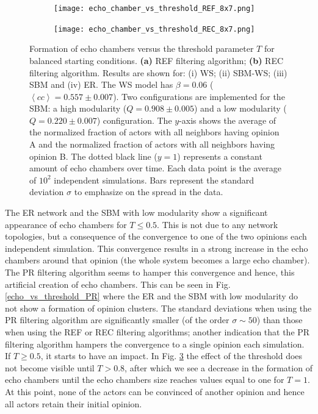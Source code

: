 \documentclass[11 pt , letterpaper , twoside , openright]{book}
\begin{document}
\begin{figure}[H]
  \begin{subfigure}[b]{0.49\textwidth}
    \caption{}
  	\texttt{[image: echo\_chamber\_vs\_threshold\_REF\_8x7.png]}
    \label{REF_thres}
  \end{subfigure}
  \begin{subfigure}[b]{0.49\textwidth}
    \caption{}
  	\texttt{[image: echo\_chamber\_vs\_threshold\_REC\_8x7.png]}
    \label{REC_thres}
  \end{subfigure}
  \captionsetup{format=plain}
  \caption[Formation of echo chambers versus the threshold parameter $T$ for balanced starting conditions. The REF and REC filtering algorithms are used and the majority threshold model is implemented.]{Formation of echo chambers versus the threshold parameter $T$ for balanced starting conditions. \textbf{(a)} REF filtering algorithm; \textbf{(b)} REC filtering algorithm. Results are shown for: (i) WS; (ii) SBM-WS; (iii) SBM and (iv) ER. The WS model has $\beta = 0.06$ ($\left<cc\right> = 0.557 \pm 0.007$). Two configurations are implemented for the SBM: a high modularity ($Q = 0.908 \pm 0.005$) and a low modularity ($Q = 0.220 \pm 0.007$) configuration. The $y$-axis shows the average of the normalized fraction of actors with all neighbors having opinion A and the normalized fraction of actors with all neighbors having opinion B. The dotted black line ($y=1$) represents a constant amount of echo chambers over time. Each data point is the average of $10^2$ independent simulations. Bars represent the standard deviation $\sigma$ to emphasize on the spread in the data.}
\label{echo_vs_threshold_REF-REC}
\end{figure}
\noindent
The ER network and the SBM with low modularity show a significant appearance of echo chambers for $T \leqslant 0.5$. This is not due to any network topologies, but a consequence of the convergence to one of the two opinions each independent simulation. This convergence results in a strong increase in the echo chambers around that opinion (the whole system becomes a large echo chamber). The PR filtering algorithm seems to hamper this convergence and hence, this artificial creation of echo chambers. This can be seen in Fig. \ref{echo_vs_threshold_PR} where the ER and the SBM with low modularity do not show a formation of opinion clusters. The standard deviations when using the PR filtering algorithm are significantly smaller (of the order $\sigma \sim 50$) than those when using the REF or REC filtering algorithms; another indication that the PR filtering algorithm hampers the convergence to a single opinion each simulation. If $T \geqslant 0.5$, it starts to have an impact. In Fig. \ref{echo_vs_threshold_REF-REC} the effect of the threshold does not become visible until $T > 0.8$, after which we see a decrease in the formation of echo chambers until the echo chambers size reaches values equal to one for $T=1$. At this point, none of the actors can be convinced of another opinion and hence all actors retain their initial opinion.
\end{document}
